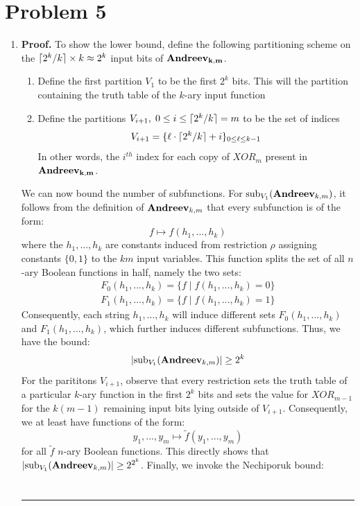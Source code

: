 \documentclass[12pt]{article}%
\DeclarePairedDelimiter\ceil{\lceil}{\rceil}
\newenvironment{proof}[1][Proof]{\textbf{#1.} }{\ \rule{0.5em}{0.5em}}
\begin{document}
\section{Problem 5}
\begin{enumerate}
  \item
  \begin{proof}
  To show the lower bound, define the following partitioning scheme on the $\ceil{2^k/k} \times k \approx 2^k$ input bits of $\bf{Andreev}_{k,m}$.
  \begin{enumerate}
    \item Define the first partition $V_1$ to be the first $2^k$ bits. This will the partition containing the truth table of the $k$-ary input function
    \item Define the partitions $V_{i+1}, \; 0 \leq i \leq \ceil{2^k/k} = m$ to be the set of indices $$ V_{i+1} = \{\ell \cdot \ceil{2^k/k} + i \}_{0\leq \ell \leq k-1}$$ In other words, the $i^{th}$ index for each copy of $XOR_m$ present in $\bf{Andreev}_{k,m}$.
  \end{enumerate}
  We can now bound the number of subfunctions. For $\text{sub}_{V_1}({\bf Andreev}_{k,m})$, it follows from the definition of ${\bf Andreev}_{k,m}$ that every subfunction is of the form:
  $$ f \mapsto f(h_1,...,h_k) $$ where the $h_1,...,h_k$ are constants induced from restriction $\rho$ assigning constants $\{0,1\}$ to the $km$ input variables. This function splits the set of all $n$-ary Boolean functions in half, namely the two sets:
  \begin{gather*}
    F_0(h_1,...,h_k) = \{f \mid f(h_1,...,h_k) = 0\} \\
    F_1(h_1,...,h_k) = \{f \mid f(h_1,...,h_k) = 1\}
  \end{gather*}
  Consequently, each string $h_1,...,h_k$ will induce different sets $F_0(h_1,...,h_k)$ and $F_1(h_1,...,h_k)$, which further induces different subfunctions. Thus, we have the bound:
  $$|\text{sub}_{V_1}({\bf Andreev}_{k,m})| \geq 2^k $$
  For the parititons $V_{i+1}$, observe that every restriction sets the truth table of a particular $k$-ary function in the first $2^k$ bits and sets the value for $XOR_{m-1}$ for the $k(m - 1)$ remaining input bits lying outside of $V_{i+1}$. Consequently, we at least have functions of the form:
  $$ y_1,...,y_m \mapsto \tilde{f}(y_1,...,y_m) $$ for all $\tilde{f}$ $n$-ary Boolean functions. This directly shows that
  $|\text{sub}_{V_1}({\bf Andreev}_{k,m})| \geq 2^{2^k}$.
  Finally, we invoke the Nechiporuk bound:
  \begin{gather*}

\end{gather*}
\end{proof}
\end{enumerate}
\end{document}
